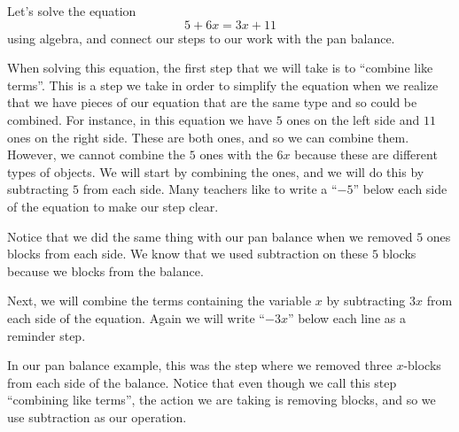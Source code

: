 \documentclass{ximera}
\begin{document}
\begin{example}
Let's solve the equation
\[
5 + 6x = 3x + 11
\]
using algebra, and connect our steps to our work with the pan balance. 

When solving this equation, the first step that we will take is to ``combine like terms''. This is a step we take in order to simplify the equation when we realize that we have pieces of our equation that are the same type and so could be combined. For instance, in this equation we have $5$ ones on the left side and $11$ ones on the right side. These are both ones, and so we can combine them. However, we cannot combine the $5$ ones with the $6x$ because these are different types of objects. We will start by combining the ones, and we will do this by subtracting $5$ from each side. Many teachers like to write a ``$-5$'' below each side of the equation to make our step clear.
\begin{image}
 \end{image}

Notice that we did the same thing with our pan balance when we removed $5$ ones blocks from each side. We know that we used subtraction on these $5$ blocks because we  blocks from the balance.

Next, we will combine the terms containing the variable $x$ by subtracting $3x$ from each side of the equation. Again we will write ``$-3x$'' below each line as a reminder step.

\begin{image}
 \end{image}

In our pan balance example, this was the step where we removed three $x$-blocks from each side of the balance. Notice that even though we call this step ``combining like terms'', the action we are taking is removing blocks, and so we use subtraction as our operation. 


\end{example}
\end{document}
